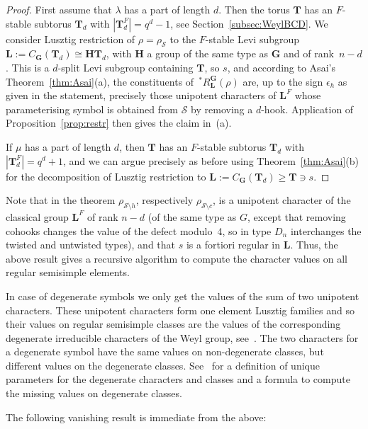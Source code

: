 \documentclass{ert-l}
\newcommand{\bG}{{\mathbf{G}}}
\newcommand{\bH}{{\mathbf{H}}}
\newcommand{\bL}{{\mathbf{L}}}
\newcommand{\bT}{{\mathbf{T}}}
\newcommand{\cS}{{\mathcal{S}}}
\newcommand\sRLG{{\,{}^*R_\bL^\bG}}
\let\eps=\epsilon
\let\la=\lambda
\let\sm=\setminus
\theoremstyle{definition}
\theoremstyle{remark}
\begin{document}
\begin{proof}
First assume that $\la$ has a part of length $d$. Then the torus $\bT$ has
an $F$-stable subtorus $\bT_d$ with $|\bT_d^F|=q^d-1$, see
Section~\ref{subsec:WeylBCD}. We consider Lusztig restriction of
$\rho=\rho_\cS$ to the $F$-stable Levi subgroup
$\bL:=C_\bG(\bT_d)\cong\bH\bT_d$, with $\bH$ a group of the same type as
$\bG$ and of rank~$n-d$. This is a $d$-split Levi subgroup containing $\bT$,
so $s$, and according to Asai's Theorem~\ref{thm:Asai}(a), the
constituents of $\sRLG(\rho)$
are, up to the sign $\eps_h$ as given in the statement, precisely those
unipotent characters of $\bL^F$ whose parameterising symbol is obtained from
$\cS$ by removing a $d$-hook. Application of Proposition~\ref{prop:restr}
then gives the claim in~(a).
\par
If $\mu$ has a part of length $d$, then $\bT$ has an $F$-stable subtorus
$\bT_d$ with $|\bT_d^F|=q^d+1$, and we can argue precisely as before using
Theorem~\ref{thm:Asai}(b) for the decomposition of Lusztig restriction to
$\bL:=C_\bG(\bT_d)\ge\bT\ni s$.
\end{proof}

Note that in the theorem $\rho_{\cS\sm h}$, respectively $\rho_{\cS\sm c}$,
is a unipotent character of the classical group $\bL^F$ of rank $n-d$ (of the
same type as $G$, except that removing cohooks changes the value of the defect
modulo~4, so in type $D_n$ interchanges the twisted and untwisted types), and
that $s$ is a fortiori regular in $\bL$. Thus, the above result gives a
recursive algorithm to compute the character values on all regular semisimple
elements.

In case of degenerate symbols we only get the values of the sum of two
unipotent characters. These unipotent characters form one element Lusztig
families and so their values on regular semisimple classes are the values of
the corresponding degenerate irreducible characters of the Weyl group,
see~\cite[(4.6.10)]{Lu84}. The two characters for
a degenerate symbol have the same values on non-degenerate classes, but
different values on the degenerate classes. See~\cite{PfWeyl} for a
definition of unique parameters for the degenerate characters and classes
and a formula to compute the missing values on degenerate classes.

The following vanishing result is immediate from the above:
\end{document}
